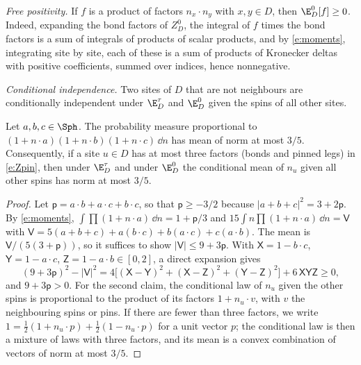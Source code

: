 \emph{Free positivity.} If $f$ is a product of factors $n_x \cdot n_y$ with $x, y \in D$, then $\E^0_D[f] \ge 0$. Indeed, expanding the bond factors of $Z^0_D$, the integral of $f$ times the bond factors is a sum of integrals of products of scalar products, and by \eqref{e:moments}, integrating site by site, each of these is a sum of products of Kronecker deltas with positive coefficients, summed over indices, hence nonnegative.

\emph{Conditional independence.} Two sites of $D$ that are not neighbours are conditionally independent under $\E^\tau_D$ and $\E^0_D$ given the spins of all other sites.

\begin{lemma}\label{l:35}
Let $a, b, c \in \Sph$. The probability measure proportional to $(1 + n \cdot a)(1 + n \cdot b)(1 + n \cdot c) \, \dd n$ has mean of norm at most $3/5$. Consequently, if a site $u \in D$ has at most three factors (bonds and pinned legs) in \eqref{e:Zpin}, then under $\E^\tau_D$ and under $\E^0_D$ the conditional mean of $n_u$ given all other spins has norm at most $3/5$.
\end{lemma}

\begin{proof}
Let $\mathsf p = a \cdot b + a \cdot c + b \cdot c$, so that $\mathsf p \ge -3/2$ because $|a + b + c|^2 = 3 + 2 \mathsf p$. By \eqref{e:moments}, $\int \prod (1 + n \cdot a) \, \dd n = 1 + \mathsf p/3$ and $15 \int n \prod (1 + n \cdot a) \, \dd n = \mathsf V$ with $\mathsf V = 5(a + b + c) + a (b \cdot c) + b (a \cdot c) + c (a \cdot b)$. The mean is $\mathsf V / (5 (3 + \mathsf p))$, so it suffices to show $|\mathsf V| \le 9 + 3 \mathsf p$. With $\mathsf X = 1 - b \cdot c$, $\mathsf Y = 1 - a \cdot c$, $\mathsf Z = 1 - a \cdot b \in [0, 2]$, a direct expansion gives
\begin{equation*}
(9 + 3 \mathsf p)^2 - |\mathsf V|^2 = 4 \bigl[ (\mathsf X - \mathsf Y)^2 + (\mathsf X - \mathsf Z)^2 + (\mathsf Y - \mathsf Z)^2 \bigr] + 6 \, \mathsf X \mathsf Y \mathsf Z \ge 0,
\end{equation*}
and $9 + 3 \mathsf p > 0$. For the second claim, the conditional law of $n_u$ given the other spins is proportional to the product of its factors $1 + n_u \cdot v$, with $v$ the neighbouring spins or pins. If there are fewer than three factors, we write $1 = \frac12 (1 + n_u \cdot p) + \frac12 (1 - n_u \cdot p)$ for a unit vector $p$; the conditional law is then a mixture of laws with three factors, and its mean is a convex combination of vectors of norm at most $3/5$.
\end{proof}

